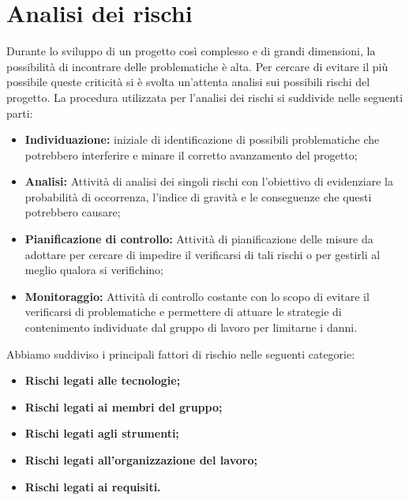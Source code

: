 \section{Analisi dei rischi}
\label{analisi_dei_rischi}
Durante lo sviluppo di un progetto così complesso e di grandi dimensioni, la possibilità di incontrare delle problematiche è alta. Per cercare di evitare il più possibile queste criticità si è svolta un'attenta analisi sui possibili rischi del progetto. La procedura utilizzata per l'analisi dei rischi si suddivide nelle seguenti parti:
\begin{itemize}
    \item \textbf{Individuazione:}  iniziale di identificazione di possibili problematiche che potrebbero interferire e minare il corretto avanzamento del progetto;
    \item \textbf{Analisi:} Attività di analisi dei singoli rischi con l'obiettivo di evidenziare la probabilità di occorrenza, l'indice di gravità e le conseguenze che questi potrebbero causare;
    \item \textbf{Pianificazione di controllo:} Attività di pianificazione delle misure da adottare per cercare di impedire il verificarsi di tali rischi o per gestirli al meglio qualora si verifichino;
    \item \textbf{Monitoraggio:} Attività di controllo costante con lo scopo di evitare il verificarsi di problematiche e permettere di attuare le strategie di contenimento individuate dal gruppo di lavoro per limitarne i danni.
\end{itemize}
Abbiamo suddiviso i principali fattori di rischio nelle seguenti categorie:
\begin{itemize}
    \item \textbf{Rischi legati alle tecnologie;}
    \item \textbf{Rischi legati ai membri del gruppo;}
    \item \textbf{Rischi legati agli strumenti;}
    \item \textbf{Rischi legati all'organizzazione del lavoro;}
    \item \textbf{Rischi legati ai requisiti.}
\end{itemize}

\renewcommand{\arraystretch}{1.5}

\newpage


\newpage


\newpage


\newpage


\newpage
